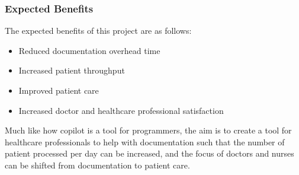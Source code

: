 \documentclass[12pt]{article}
\begin{document}
\subsubsection{Expected Benefits} \label{sec_ExpectedBenefits}

The expected benefits of this project are as follows:
\begin{itemize}
  \item Reduced documentation overhead time
  \item Increased patient throughput
  \item Improved patient care
  \item Increased doctor and healthcare professional satisfaction
\end{itemize}

Much like how copilot is a tool for programmers, the aim is to create a tool for healthcare professionals to help with documentation such that the number of patient processed per day can be increased, and the focus of doctors and nurses can be shifted from documentation to patient care. 
\end{document}
